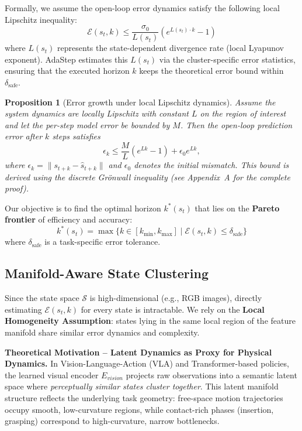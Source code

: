 \documentclass[conference]{IEEEtran}
\newtheorem{proposition}{Proposition}
\begin{document}
Formally, we assume the open-loop error dynamics satisfy the following local Lipschitz inequality:
\begin{equation}
\label{eq:lipschitz}
\mathcal{E}(s_t, k) \le \frac{\sigma_{0}}{L(s_t)} (e^{L(s_t) \cdot k} - 1)
\end{equation}
where $L(s_t)$ represents the state-dependent divergence rate (local Lyapunov exponent). AdaStep estimates this $L(s_t)$ via the cluster-specific error statistics, ensuring that the executed horizon $k$ keeps the theoretical error bound within $\delta_{\text{safe}}$.

\begin{proposition}[Error growth under local Lipschitz dynamics]
Assume the system dynamics are locally Lipschitz with constant $L$ on the region of interest and let the per-step model error be bounded by $M$. Then the open-loop prediction error after $k$ steps satisfies
\[\epsilon_k \le \frac{M}{L}(e^{Lk}-1)+\epsilon_0 e^{Lk},\]
where $\epsilon_k=\|s_{t+k}-\hat s_{t+k}\|$ and $\epsilon_0$ denotes the initial mismatch. This bound is derived using the discrete Gr\"onwall inequality (see Appendix~A for the complete proof).
\end{proposition}

Our objective is to find the optimal horizon $k^*(s_t)$ that lies on the \textbf{Pareto frontier} of efficiency and accuracy:
\begin{equation}
\label{eq:objective}
k^*(s_t) = \max \{ k \in [k_{\min}, k_{\max}] \mid \mathcal{E}(s_t, k) \le \delta_{\text{safe}} \}
\end{equation}
where $\delta_{\text{safe}}$ is a task-specific error tolerance.

\subsection{Manifold-Aware State Clustering}
\label{sec:manifold_aware}
Since the state space $\mathcal{S}$ is high-dimensional (e.g., RGB images), directly estimating $\mathcal{E}(s_t, k)$ for every state is intractable. We rely on the \textbf{Local Homogeneity Assumption}: states lying in the same local region of the feature manifold share similar error dynamics and complexity.

\textbf{Theoretical Motivation -- Latent Dynamics as Proxy for Physical Dynamics.} 
In Vision-Language-Action (VLA) and Transformer-based policies, the learned visual encoder $E_{vision}$ projects raw observations into a semantic latent space where \emph{perceptually similar states cluster together}. This latent manifold structure reflects the underlying task geometry: free-space motion trajectories occupy smooth, low-curvature regions, while contact-rich phases (insertion, grasping) correspond to high-curvature, narrow bottlenecks.
\end{document}
